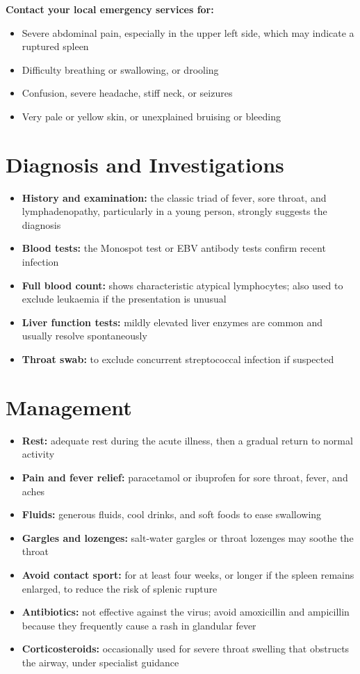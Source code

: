 \textbf{Contact your local emergency services for:}
\begin{itemize}
    \item Severe abdominal pain, especially in the upper left side, which may indicate a ruptured spleen
    \item Difficulty breathing or swallowing, or drooling
    \item Confusion, severe headache, stiff neck, or seizures
    \item Very pale or yellow skin, or unexplained bruising or bleeding
\end{itemize}

\section*{Diagnosis and Investigations}
\begin{itemize}
    \item \textbf{History and examination:} the classic triad of fever, sore throat, and lymphadenopathy, particularly in a young person, strongly suggests the diagnosis
    \item \textbf{Blood tests:} the Monospot test or EBV antibody tests confirm recent infection
    \item \textbf{Full blood count:} shows characteristic atypical lymphocytes; also used to exclude leukaemia if the presentation is unusual
    \item \textbf{Liver function tests:} mildly elevated liver enzymes are common and usually resolve spontaneously
    \item \textbf{Throat swab:} to exclude concurrent streptococcal infection if suspected
\end{itemize}

\section*{Management}
\begin{itemize}
    \item \textbf{Rest:} adequate rest during the acute illness, then a gradual return to normal activity
    \item \textbf{Pain and fever relief:} paracetamol or ibuprofen for sore throat, fever, and aches
    \item \textbf{Fluids:} generous fluids, cool drinks, and soft foods to ease swallowing
    \item \textbf{Gargles and lozenges:} salt-water gargles or throat lozenges may soothe the throat
    \item \textbf{Avoid contact sport:} for at least four weeks, or longer if the spleen remains enlarged, to reduce the risk of splenic rupture
    \item \textbf{Antibiotics:} not effective against the virus; avoid amoxicillin and ampicillin because they frequently cause a rash in glandular fever
    \item \textbf{Corticosteroids:} occasionally used for severe throat swelling that obstructs the airway, under specialist guidance
\end{itemize}

